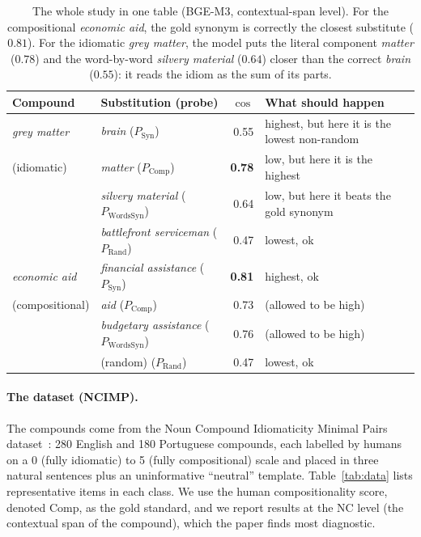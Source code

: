 \documentclass[11pt]{article}
\newcommand{\Syn}{P_{\mathrm{Syn}}}
\newcommand{\Comp}{P_{\mathrm{Comp}}}
\newcommand{\Words}{P_{\mathrm{WordsSyn}}}
\newcommand{\Rand}{P_{\mathrm{Rand}}}
\begin{document}
\begin{table}[H]
\centering
\small
\begin{tabular}{llrl}
\toprule
Compound & Substitution (probe) & $\cos$ & What should happen \\
\midrule
\emph{grey matter} & \emph{brain} \;($\Syn$) & 0.55 & highest, but here it is the lowest non-random \\
(idiomatic) & \emph{matter} \;($\Comp$) & \textbf{0.78} & low, but here it is the highest \\
 & \emph{silvery material} \;($\Words$) & 0.64 & low, but here it beats the gold synonym \\
 & \emph{battlefront serviceman} \;($\Rand$) & 0.47 & lowest, ok \\
\midrule
\emph{economic aid} & \emph{financial assistance} \;($\Syn$) & \textbf{0.81} & highest, ok \\
(compositional) & \emph{aid} \;($\Comp$) & 0.73 & (allowed to be high) \\
 & \emph{budgetary assistance} \;($\Words$) & 0.76 & (allowed to be high) \\
 & (random) \;($\Rand$) & 0.47 & lowest, ok \\
\bottomrule
\end{tabular}
\caption{The whole study in one table (BGE-M3, contextual-span level). For the compositional
\emph{economic aid}, the gold synonym is correctly the closest substitute ($0.81$). For the
idiomatic \emph{grey matter}, the model puts the literal component \emph{matter} ($0.78$) and the
word-by-word \emph{silvery material} ($0.64$) closer than the correct \emph{brain} ($0.55$): it
reads the idiom as the sum of its parts.}
\label{tab:worked}
\end{table}

\paragraph{The dataset (NCIMP).} The compounds come from the Noun Compound Idiomaticity Minimal
Pairs dataset~\cite{he2025idiomaticity}: 280 English and 180 Portuguese compounds, each labelled by
humans on a 0 (fully idiomatic) to 5 (fully compositional) scale and placed in three natural
sentences plus an uninformative ``neutral'' template. Table~\ref{tab:data} lists representative
items in each class. We use the human compositionality score, denoted $\mathrm{Comp}$, as the gold
standard, and we report results at the NC level (the contextual span of the compound), which the
paper finds most diagnostic.
\end{document}
